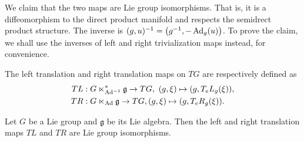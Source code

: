 \documentclass[12pt,class=article,crop=false]{standalone}
\begin{document}
We claim that the two maps are Lie group isomorphisms. That is, it is a diffeomorphism to the direct product manifold and respects the semidrect product structure. The inverse is $ (g,u)^{-1} = \left( g^{-1}, - \operatorname{Ad}_{ g}( u) \right)$. To prove the claim, we shall use the inverses of left and right trivialization maps instead, for convenience.
\begin{defn}
The left translation and right translation maps on $ TG$ are respectively defined as
\begin{align*}
	TL&: G\ltimes_{ \operatorname{Ad}^{-1}}^*  \mathfrak{ g} \to TG,\ (g,\xi) \mapsto (g,T_eL_g (\xi)), \\
	TR&: G \ltimes _{\operatorname{Ad}} \mathfrak{g} \to TG, (g, \xi) \mapsto (g, T_eR_g (\xi)) .
\end{align*}
\end{defn}

\begin{prop} 
Let $ G$ be a Lie group and  $ \mathfrak{ g }$ be its Lie algebra. Then the left and right translation maps $ TL$ and  $ TR$ are Lie group isomorphisms.
\end{prop}
\end{document}
